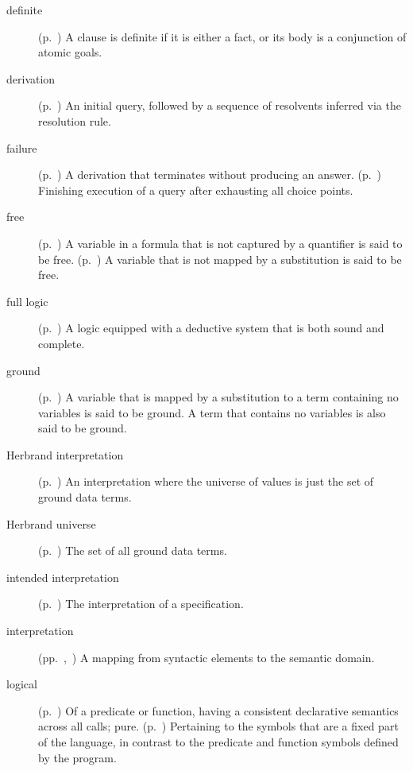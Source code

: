 \begin{description}
\item[definite]
(p.~\pageref{gi:definite})
A clause is definite if it is either a fact,
or its body is a conjunction of atomic goals.

\item[derivation]
(p.~\pageref{gi:derivation})
An initial query,
followed by a sequence of resolvents inferred
via the resolution rule.

\item[failure]
(p.~\pageref{gi:failure})
A derivation that terminates without producing an answer.
(p.~\pageref{gi:failure})
Finishing execution of a query
after exhausting all choice points.

\item[free]
(p.~\pageref{gi:free})
A variable in a formula that is not captured by a quantifier
is said to be free.
(p.~\pageref{gi:free2})
A variable that is not mapped by a substitution is said to be free.

\item[full logic]
(p.~\pageref{gi:full-logic})
A logic equipped with a deductive system that is both sound and complete.

\item[ground]
(p.~\pageref{gi:ground})
A variable that is mapped by a substitution
to a term containing no variables
is said to be ground.
A term that contains no variables is also said to be ground.

\item[Herbrand interpretation]
(p.~\pageref{gi:herbrand-interpretation})
An interpretation where the universe of values
is just the set of ground data terms.

\item[Herbrand universe]
(p.~\pageref{gi:herbrand-universe})
The set of all ground data terms.

\item[intended interpretation]
(p.~\pageref{gi:intended-interpretation})
The interpretation of a specification.

\item[interpretation]
(pp.~\pageref{gi:interpretation},~\pageref{sec:interpretations})
A mapping from syntactic elements to the semantic domain.

\item[logical]
(p.~\pageref{gi:non-logical})
Of a predicate or function,
having a consistent declarative semantics across all calls; pure.
(p.~\pageref{gi:non-logical2})
Pertaining to the symbols that are a fixed part of the language,
in contrast to the predicate and function symbols defined by the program.


\end{description}
